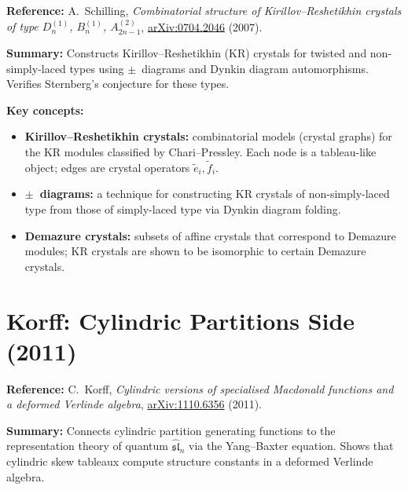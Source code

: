 \documentclass[11pt]{article}
\begin{document}
\textbf{Reference:} A.~Schilling,
\emph{Combinatorial structure of Kirillov--Reshetikhin crystals of
type $D_n^{(1)}$, $B_n^{(1)}$, $A_{2n-1}^{(2)}$},
\href{https://arxiv.org/abs/0704.2046}{arXiv:0704.2046} (2007).

\medskip
\noindent\textbf{Summary:}
Constructs Kirillov--Reshetikhin (KR) crystals for twisted and
non-simply-laced types using $\pm$~diagrams and Dynkin diagram
automorphisms.  Verifies Sternberg's conjecture for these types.

\medskip
\noindent\textbf{Key concepts:}
\begin{itemize}
  \item \textbf{Kirillov--Reshetikhin crystals:} combinatorial models
    (crystal graphs) for the KR modules classified by Chari--Pressley.
    Each node is a tableau-like object; edges are crystal operators
    $\tilde{e}_i, \tilde{f}_i$.
  \item \textbf{$\pm$~diagrams:} a technique for constructing KR
    crystals of non-simply-laced type from those of simply-laced type
    via Dynkin diagram folding.
  \item \textbf{Demazure crystals:} subsets of affine crystals that
    correspond to Demazure modules; KR crystals are shown to be
    isomorphic to certain Demazure crystals.
\end{itemize}

\section{Korff: Cylindric Partitions Side (2011)}

\textbf{Reference:} C.~Korff,
\emph{Cylindric versions of specialised Macdonald functions and a
deformed Verlinde algebra},
\href{https://arxiv.org/abs/1110.6356}{arXiv:1110.6356} (2011).

\medskip
\noindent\textbf{Summary:}
Connects cylindric partition generating functions to the
representation theory of quantum $\widehat{\mathfrak{sl}}_n$
via the Yang--Baxter equation.  Shows that cylindric skew tableaux
compute structure constants in a deformed Verlinde algebra.
\end{document}
